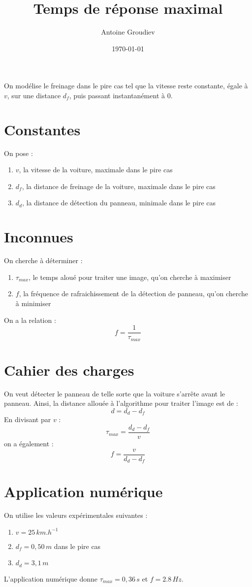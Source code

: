 \documentclass[12pt,a4paper]{article}
\author{Antoine Groudiev}
\title{Temps de réponse maximal}
\date{\today}
\begin{document}
\maketitle
On modélise le freinage dans le pire cas tel que la vitesse reste constante, égale à $v$, sur une distance $d_f$, puis passant instantanément à $0$.
\section{Constantes}
    On pose :
    \begin{enumerate}
        \item $v$, la vitesse de la voiture, maximale dans le pire cas
        \item $d_f$, la distance de freinage de la voiture, maximale dans le pire cas
        \item $d_d$, la distance de détection du panneau, minimale dans le pire cas
    \end{enumerate}

\section{Inconnues}
    On cherche à déterminer :
    \begin{enumerate}
        \item $\tau_{max}$, le temps aloué pour traiter une image, qu'on cherche à maximiser
        \item $f$, la fréquence de rafraichissement de la détection de panneau, qu'on cherche à minimiser
    \end{enumerate}

    On a la relation :
    $$f = \frac{1}{\tau_{max}}$$
\section{Cahier des charges}
    On veut détecter le panneau de telle sorte que la voiture s'arrête avant le panneau. 
    Ainsi, la distance allouée à l'algorithme pour traiter l'image est de :
    $$d = d_d - d_f$$
    En divisant par $v$ :
    $$\boxed{\tau_{max} = \frac{d_d - d_f}{v}}$$
    on a également :
    $$\boxed{f = \frac{v}{d_d - d_f}}$$

\section{Application numérique}
On utilise les valeurs expérimentales suivantes :
\begin{enumerate}
    \item $v = 25 \, km.h^{-1}$
    \item $d_f = 0,50 \, m$ dans le pire cas
    \item $d_d = 3,1 \, m$
\end{enumerate}
L'application numérique donne $\boxed{\tau_{max} = 0,36 \, s}$ et $\boxed{f = 2.8 \, Hz}$.
\end{document}

